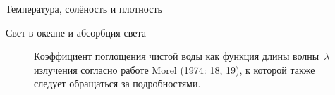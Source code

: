 \begin{chapter}{Температура, солёность и плотность}
\begin{section}{Свет в океане и абсорбция света}
\begin{figure}[t!]
\caption{Коэффициент поглощения чистой воды как функция длины волны~$\lambda$ 
излучения согласно работе Morel (1974: 18, 19), к которой также следует
обращаться за подробностями.} 
\label{fig:attenuation}
\end{figure}
%


\end{section}
\end{chapter}
